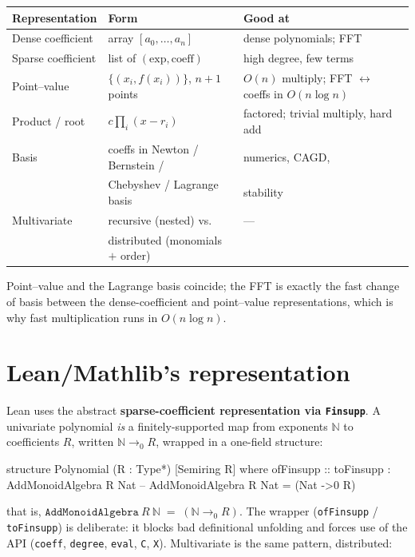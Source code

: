 \documentclass[11pt]{article}
\newcommand{\NN}{\mathbb{N}}
\newcommand{\finsupp}{\to_{0}}        %
\newcommand{\code}[1]{\texttt{#1}}
\begin{document}
\begin{center}
\begin{tabular}{@{}lll@{}}
\toprule
Representation & Form & Good at \\
\midrule
Dense coefficient & array $[a_0,\dots,a_n]$ & dense polynomials; FFT \\
Sparse coefficient & list of $(\text{exp},\text{coeff})$ & high degree, few terms \\
Point--value & $\{(x_i, f(x_i))\}$, $n{+}1$ points & $O(n)$ multiply; FFT $\leftrightarrow$ coeffs in $O(n\log n)$ \\
Product / root & $c\prod_i (x - r_i)$ & factored; trivial multiply, hard add \\
Basis & coeffs in Newton / Bernstein / & numerics, CAGD, \\
      & Chebyshev / Lagrange basis & stability \\
Multivariate & recursive (nested) vs.\ & — \\
             & distributed (monomials $+$ order) & \\
\bottomrule
\end{tabular}
\end{center}

Point--value and the Lagrange basis coincide; the FFT is exactly the fast
change of basis between the dense-coefficient and point--value representations,
which is why fast multiplication runs in $O(n\log n)$.

\section{Lean/Mathlib's representation}

Lean uses the abstract \textbf{sparse-coefficient representation via
\code{Finsupp}}. A univariate polynomial \emph{is} a finitely-supported map from
exponents $\NN$ to coefficients $R$, written $\NN \finsupp R$, wrapped in a
one-field structure:

\begin{lean}
structure Polynomial (R : Type*) [Semiring R] where ofFinsupp ::
  toFinsupp : AddMonoidAlgebra R Nat     -- AddMonoidAlgebra R Nat  =  (Nat ->0 R)
\end{lean}

\noindent that is, $\code{AddMonoidAlgebra}\ R\ \NN \;=\; (\NN \finsupp R)$. The
wrapper (\code{ofFinsupp} / \code{toFinsupp}) is deliberate: it blocks bad
definitional unfolding and forces use of the API (\code{coeff}, \code{degree},
\code{eval}, \code{C}, \code{X}). Multivariate is the same pattern, distributed:
\end{document}
